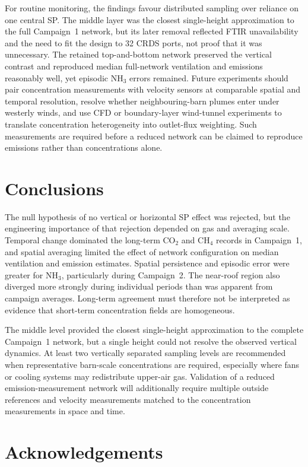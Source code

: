 \documentclass[12pt,a4paper]{article}
\begin{document}
For routine monitoring, the findings favour distributed sampling over reliance on one central SP. The middle layer was the closest single-height approximation to the full Campaign~1 network, but its later removal reflected FTIR unavailability and the need to fit the design to 32 CRDS ports, not proof that it was unnecessary. The retained top-and-bottom network preserved the vertical contrast and reproduced median full-network ventilation and emissions reasonably well, yet episodic \(\mathrm{NH_3}\) errors remained. Future experiments should pair concentration measurements with velocity sensors at comparable spatial and temporal resolution, resolve whether neighbouring-barn plumes enter under westerly winds, and use CFD or boundary-layer wind-tunnel experiments to translate concentration heterogeneity into outlet-flux weighting. Such measurements are required before a reduced network can be claimed to reproduce emissions rather than concentrations alone.

\section{Conclusions}

The null hypothesis of no vertical or horizontal SP effect was rejected, but the engineering importance of that rejection depended on gas and averaging scale. Temporal change dominated the long-term \(\mathrm{CO_2}\) and \(\mathrm{CH_4}\) records in Campaign~1, and spatial averaging limited the effect of network configuration on median ventilation and emission estimates. Spatial persistence and episodic error were greater for \(\mathrm{NH_3}\), particularly during Campaign~2. The near-roof region also diverged more strongly during individual periods than was apparent from campaign averages. Long-term agreement must therefore not be interpreted as evidence that short-term concentration fields are homogeneous.

The middle level provided the closest single-height approximation to the complete Campaign~1 network, but a single height could not resolve the observed vertical dynamics. At least two vertically separated sampling levels are recommended when representative barn-scale concentrations are required, especially where fans or cooling systems may redistribute upper-air gas. Validation of a reduced emission-measurement network will additionally require multiple outside references and velocity measurements matched to the concentration measurements in space and time.

\section*{Acknowledgements}
\end{document}
